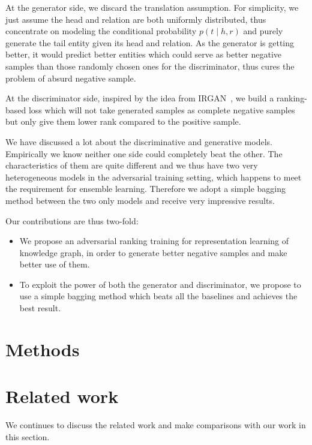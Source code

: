 \documentclass[twocolumn,a4paper,10pt,review,3p]{elsarticle}
\begin{document}
At the generator side, we discard the translation assumption. For simplicity, we just assume the head and relation are both uniformly distributed, thus concentrate on modeling the conditional probability $p(t\mid h, r)$ and purely generate the tail entity given its head and relation. As the generator is getting better, it would predict better entities which could serve as better negative samples than those randomly chosen ones for the discriminator, thus cures the problem of absurd negative sample.

At the discriminator side, inspired by the idea from IRGAN~\cite{IRGAN}, we build a ranking-based loss which will not take generated samples as complete negative samples but only give them lower rank compared to the positive sample.

We have discussed a lot about the discriminative and generative models. Empirically we know neither one side could completely beat the other. The characteristics of them are quite different and we thus have two very heterogeneous models in the adversarial training setting, which happens to meet the requirement for ensemble learning. Therefore we adopt a simple bagging method between the two only models and receive very impressive results.

Our contributions are thus two-fold:
\begin{itemize}
    \item We propose an adversarial ranking training for representation learning of knowledge graph, in order to generate better negative samples and make better use of them.
    \item To exploit the power of both the generator and discriminator, we propose to use a simple bagging method which beats all the baselines and achieves the best result.
\end{itemize}



\section{Methods}


\section{Related work}

We continues to discuss the related work and make comparisons with our work in this section.
\end{document}
